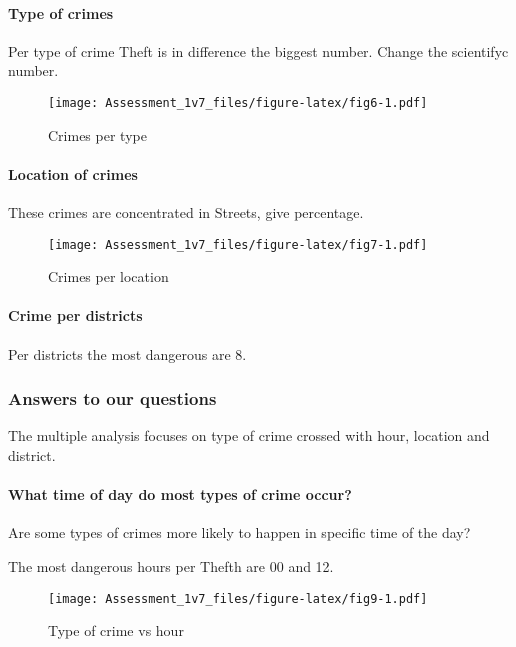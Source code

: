 \documentclass[]{article}
\let\oldparagraph\paragraph
\renewcommand{\paragraph}[1]{\oldparagraph{#1}\mbox{}}
\begin{document}
\paragraph{Type of crimes}\label{type-of-crimes}

Per type of crime Theft is in difference the biggest number. Change the
scientifyc number.

\begin{figure}[htbp]
\centering
\texttt{[image: Assessment\_1v7\_files/figure-latex/fig6-1.pdf]}
\caption{Crimes per type}
\end{figure}

\paragraph{Location of crimes}\label{location-of-crimes}

These crimes are concentrated in Streets, give percentage.

\begin{figure}[htbp]
\centering
\texttt{[image: Assessment\_1v7\_files/figure-latex/fig7-1.pdf]}
\caption{Crimes per location}
\end{figure}

\paragraph{Crime per districts}\label{crime-per-districts}

Per districts the most dangerous are 8.

\subsubsection{Answers to our questions}\label{answers-to-our-questions}

The multiple analysis focuses on type of crime crossed with hour,
location and district.

\paragraph{What time of day do most types of crime
occur?}\label{what-time-of-day-do-most-types-of-crime-occur}

Are some types of crimes more likely to happen in specific time of the
day?

The most dangerous hours per Thefth are 00 and 12.

\begin{figure}[htbp]
\centering
\texttt{[image: Assessment\_1v7\_files/figure-latex/fig9-1.pdf]}
\caption{Type of crime vs hour}
\end{figure}
\end{document}
